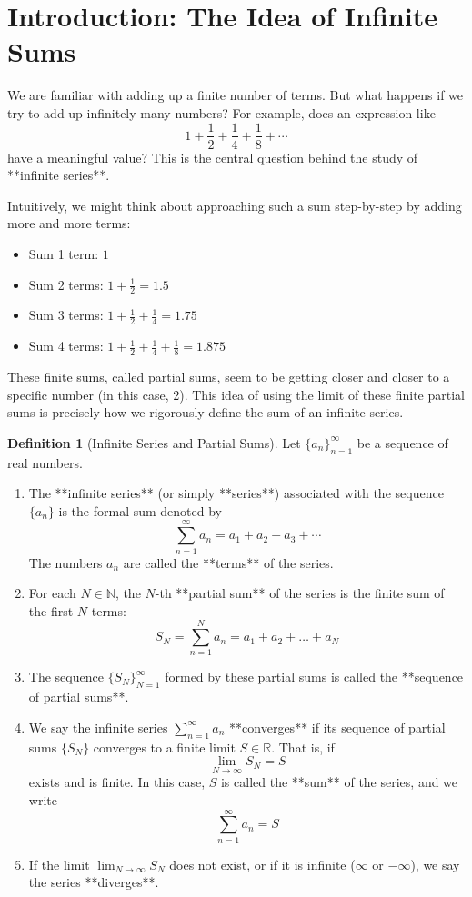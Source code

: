\documentclass[11pt, letterpaper]{article}
\theoremstyle{plain} %
\theoremstyle{definition} %
\newtheorem{definition}[theorem]{Definition} %
\theoremstyle{remark} %
\newcommand{\R}{\mathbb{R}} %
\newcommand{\N}{\mathbb{N}} %
\begin{document}
\section{Introduction: The Idea of Infinite Sums}

We are familiar with adding up a finite number of terms. But what happens if we try to add up infinitely many numbers? For example, does an expression like
\[ 1 + \frac{1}{2} + \frac{1}{4} + \frac{1}{8} + \dotsb \]
have a meaningful value? This is the central question behind the study of **infinite series**.

Intuitively, we might think about approaching such a sum step-by-step by adding more and more terms:
\begin{itemize}
    \item Sum 1 term: $1$
    \item Sum 2 terms: $1 + \frac{1}{2} = 1.5$
    \item Sum 3 terms: $1 + \frac{1}{2} + \frac{1}{4} = 1.75$
    \item Sum 4 terms: $1 + \frac{1}{2} + \frac{1}{4} + \frac{1}{8} = 1.875$
\end{itemize}
These finite sums, called partial sums, seem to be getting closer and closer to a specific number (in this case, 2). This idea of using the limit of these finite partial sums is precisely how we rigorously define the sum of an infinite series.

\begin{definition}[Infinite Series and Partial Sums]
Let $\{a_n\}_{n=1}^\infty$ be a sequence of real numbers.
\begin{enumerate}
    \item The **infinite series** (or simply **series**) associated with the sequence $\{a_n\}$ is the formal sum denoted by
    \[ \sum_{n=1}^{\infty} a_n = a_1 + a_2 + a_3 + \dotsb \]
    The numbers $a_n$ are called the **terms** of the series.
    \item For each $N \in \N$, the $N$-th **partial sum** of the series is the finite sum of the first $N$ terms:
    \[ S_N = \sum_{n=1}^{N} a_n = a_1 + a_2 + \dots + a_N \]
    \item The sequence $\{S_N\}_{N=1}^\infty$ formed by these partial sums is called the **sequence of partial sums**.
    \item We say the infinite series $\sum_{n=1}^{\infty} a_n$ **converges** if its sequence of partial sums $\{S_N\}$ converges to a finite limit $S \in \R$. That is, if
    \[ \lim_{N \to \infty} S_N = S \]
    exists and is finite. In this case, $S$ is called the **sum** of the series, and we write
    \[ \sum_{n=1}^{\infty} a_n = S \]
    \item If the limit $\lim_{N \to \infty} S_N$ does not exist, or if it is infinite ($\infty$ or $-\infty$), we say the series **diverges**.
\end{enumerate}
\end{definition}
\end{document}
